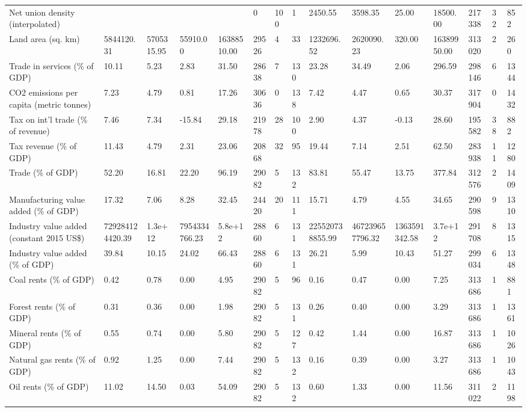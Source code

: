 \begin{longtable}{lllllllllllllll}
Net union density (interpolated) &  &  &  &  & 0 & 100 & 1 & 2450.55 & 3598.35 & 25.00 & 18500.00 & 217338 & 32 & 852\\
Land area (sq. km) & 5844120.31 & 5705315.95 & 55910.00 & 16388510.00 & 29526 & 4 & 33 & 1232696.52 & 2620090.23 & 320.00 & 16389950.00 & 313020 & 2 & 260\\
Trade in services (\% of GDP) & 10.11 & 5.23 & 2.83 & 31.50 & 28638 & 7 & 130 & 23.28 & 34.49 & 2.06 & 296.59 & 298146 & 6 & 1344\\
\addlinespace
CO2 emissions per capita (metric tonnes) & 7.23 & 4.79 & 0.81 & 17.26 & 30636 & 0 & 138 & 7.42 & 4.47 & 0.65 & 30.37 & 317904 & 0 & 1432\\
Tax on int'l trade (\% of revenue) & 7.46 & 7.34 & -15.84 & 29.18 & 21978 & 28 & 100 & 2.90 & 4.37 & -0.13 & 28.60 & 195582 & 38 & 882\\
Tax revenue (\% of GDP) & 11.43 & 4.79 & 2.31 & 23.06 & 20868 & 32 & 95 & 19.44 & 7.14 & 2.51 & 62.50 & 283938 & 11 & 1280\\
Trade (\% of GDP) & 52.20 & 16.81 & 22.20 & 96.19 & 29082 & 5 & 132 & 83.81 & 55.47 & 13.75 & 377.84 & 312576 & 2 & 1409\\
Manufacturing value added (\% of GDP) & 17.32 & 7.06 & 8.28 & 32.45 & 24420 & 20 & 111 & 15.71 & 4.79 & 4.55 & 34.65 & 290598 & 9 & 1310\\
\addlinespace
Industry value added (constant 2015 US\$) & 729284124420.39 & 1.3e+12 & 7954334766.23 & 5.8e+12 & 28860 & 6 & 131 & 225520738855.99 & 467239657796.32 & 1363591342.58 & 3.7e+12 & 291708 & 8 & 1315\\
Industry value added (\% of GDP) & 39.84 & 10.15 & 24.02 & 66.43 & 28860 & 6 & 131 & 26.21 & 5.99 & 10.43 & 51.27 & 299034 & 6 & 1348\\
Coal rents (\% of GDP) & 0.42 & 0.78 & 0.00 & 4.95 & 29082 & 5 & 96 & 0.16 & 0.47 & 0.00 & 7.25 & 313686 & 1 & 881\\
Forest rents (\% of GDP) & 0.31 & 0.36 & 0.00 & 1.98 & 29082 & 5 & 131 & 0.26 & 0.40 & 0.00 & 3.29 & 313686 & 1 & 1361\\
Mineral rents (\% of GDP) & 0.55 & 0.74 & 0.00 & 5.80 & 29082 & 5 & 127 & 0.42 & 1.44 & 0.00 & 16.87 & 313686 & 1 & 1026\\
\addlinespace
Natural gas rents (\% of GDP) & 0.92 & 1.25 & 0.00 & 7.44 & 29082 & 5 & 132 & 0.16 & 0.39 & 0.00 & 3.27 & 313686 & 1 & 1043\\
Oil rents (\% of GDP) & 11.02 & 14.50 & 0.03 & 54.09 & 29082 & 5 & 132 & 0.60 & 1.33 & 0.00 & 11.56 & 311022 & 2 & 1198\\

\end{longtable}
